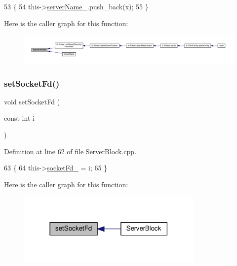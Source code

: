 \begin{DoxyCode}
53     \{
54         this->\hyperlink{classft_1_1_server_block_adc26ae834350b4c964d4198e7a431e90}{serverName\_}.push\_back(x);
55     \}
\end{DoxyCode}
Here is the caller graph for this function\+:
\nopagebreak
\begin{figure}[H]
\begin{center}
\leavevmode
\includegraphics[width=350pt]{classft_1_1_server_block_a89dfb84333debfc1871f28ef625f9556_icgraph}
\end{center}
\end{figure}
\mbox{\label{classft_1_1_server_block_aee928b6b4811d6e7bfee9d37796597f6}} 
\subsubsection{\texorpdfstring{set\+Socket\+Fd()}{setSocketFd()}}
{\footnotesize\ttfamily void set\+Socket\+Fd (\begin{DoxyParamCaption}\item[{const int}]{i }\end{DoxyParamCaption})}



Definition at line 62 of file Server\+Block.\+cpp.


\begin{DoxyCode}
63     \{
64         this->\hyperlink{classft_1_1_server_block_ab9901cea4f6daccf6b8f8a3c6f438e9c}{socketFd\_} = i;
65     \}
\end{DoxyCode}
Here is the caller graph for this function\+:
\nopagebreak
\begin{figure}[H]
\begin{center}
\leavevmode
\includegraphics[width=258pt]{classft_1_1_server_block_aee928b6b4811d6e7bfee9d37796597f6_icgraph}
\end{center}
\end{figure}


